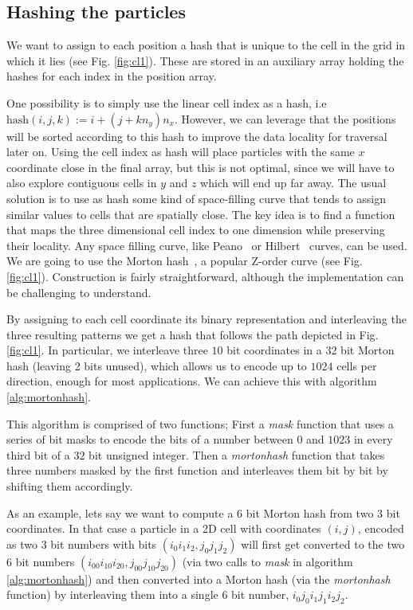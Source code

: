 \documentclass[twoside,openright,titlepage,numbers=noenddot,%
headinclude,footinclude,cleardoublepage=empty,abstract=on,
BCOR=5mm,fontsize=11pt, dvipsnames, paper=b5
]{scrreprt}
\begin{document}
\subsection*{Hashing the particles}

We want to assign to each position a hash that is unique to the cell in the grid in which it lies (see Fig. \ref{fig:cl1}).
These are stored in an auxiliary array holding the hashes for each index in the position array.

One possibility is to simply use the linear cell index as a hash, i.e $\textrm{hash}(i,j,k) := i + (j + kn_y)n_x$.
However, we can leverage that the positions will be sorted according to this hash to improve the data locality for traversal later on. Using the cell index as hash will place particles with the same $x$ coordinate close in the final array, but this is not optimal, since we will have to also explore contiguous cells in $y$ and $z$ which will end up far away.
The usual solution is to use as hash some kind of space-filling curve that tends to assign similar values to cells that are spatially close. The key idea is to find a function that maps the three dimensional cell index to one dimension while preserving their locality. Any space filling curve, like Peano~\cite{Peano1890} or Hilbert~\cite{Hilbert1935} curves, can be used.
We are going to use the Morton hash~\cite{Morton1966}, a popular Z-order curve (see Fig. \ref{fig:cl1}). Construction is fairly straightforward, although the implementation can be challenging to understand.

By assigning to each cell coordinate its binary representation and interleaving the three resulting patterns we get a hash that follows the path depicted in Fig. \ref{fig:cl1}. In particular, we interleave three $10$ bit coordinates in a $32$ bit Morton hash (leaving 2 bits unused), which allows us to encode up to $1024$ cells per direction, enough for most applications. We can achieve this with algorithm \ref{alg:mortonhash}.

This algorithm is comprised of two functions; First a \emph{mask} function that uses a series of bit masks to encode the bits of a number between $0$ and $1023$ in every third bit of a $32$ bit unsigned integer. Then a \emph{mortonhash} function that takes three numbers masked by the first function and interleaves them bit by bit by shifting them accordingly.

As an example, lets say we want to compute a $6$ bit Morton hash from two $3$ bit coordinates. In that case a particle in a 2D cell with coordinates $(i,j)$, encoded as two $3$ bit numbers with bits $(i_0i_1i_2, j_0j_1j_2)$ will first get converted to the two $6$ bit numbers $(i_00i_10i_20, j_00j_10j_20)$ (via two calls to \emph{mask} in algorithm \ref{alg:mortonhash}) and then converted into a Morton hash (via the \emph{mortonhash} function) by interleaving them into a single $6$ bit number, $i_0j_0i_1j_1i_2j_2$.
\end{document}
